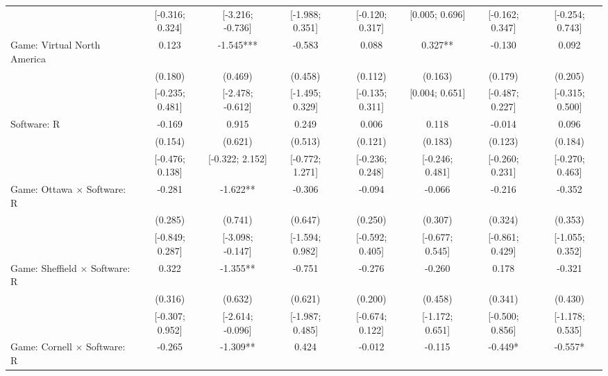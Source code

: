 \begin{tabular}{l*{7}{c}}
                    &[-0.316; 0.324]   &[-3.216; -0.736]   &[-1.988; 0.351]   &[-0.120; 0.317]   &[0.005; 0.696]   &[-0.162; 0.347]   &[-0.254; 0.743]   \\
Game: Virtual North America&       0.123   &      -1.545***&      -0.583   &       0.088   &       0.327** &      -0.130   &       0.092   \\
                    &     (0.180)   &     (0.469)   &     (0.458)   &     (0.112)   &     (0.163)   &     (0.179)   &     (0.205)   \\
                    &[-0.235; 0.481]   &[-2.478; -0.612]   &[-1.495; 0.329]   &[-0.135; 0.311]   &[0.004; 0.651]   &[-0.487; 0.227]   &[-0.315; 0.500]   \\
Software: R         &      -0.169   &       0.915   &       0.249   &       0.006   &       0.118   &      -0.014   &       0.096   \\
                    &     (0.154)   &     (0.621)   &     (0.513)   &     (0.121)   &     (0.183)   &     (0.123)   &     (0.184)   \\
                    &[-0.476; 0.138]   &[-0.322; 2.152]   &[-0.772; 1.271]   &[-0.236; 0.248]   &[-0.246; 0.481]   &[-0.260; 0.231]   &[-0.270; 0.463]   \\
Game: Ottawa $\times$ Software: R&      -0.281   &      -1.622** &      -0.306   &      -0.094   &      -0.066   &      -0.216   &      -0.352   \\
                    &     (0.285)   &     (0.741)   &     (0.647)   &     (0.250)   &     (0.307)   &     (0.324)   &     (0.353)   \\
                    &[-0.849; 0.287]   &[-3.098; -0.147]   &[-1.594; 0.982]   &[-0.592; 0.405]   &[-0.677; 0.545]   &[-0.861; 0.429]   &[-1.055; 0.352]   \\
Game: Sheffield $\times$ Software: R&       0.322   &      -1.355** &      -0.751   &      -0.276   &      -0.260   &       0.178   &      -0.321   \\
                    &     (0.316)   &     (0.632)   &     (0.621)   &     (0.200)   &     (0.458)   &     (0.341)   &     (0.430)   \\
                    &[-0.307; 0.952]   &[-2.614; -0.096]   &[-1.987; 0.485]   &[-0.674; 0.122]   &[-1.172; 0.651]   &[-0.500; 0.856]   &[-1.178; 0.535]   \\
Game: Cornell $\times$ Software: R&      -0.265   &      -1.309** &       0.424   &      -0.012   &      -0.115   &      -0.449*  &      -0.557*  \\

\end{tabular}
